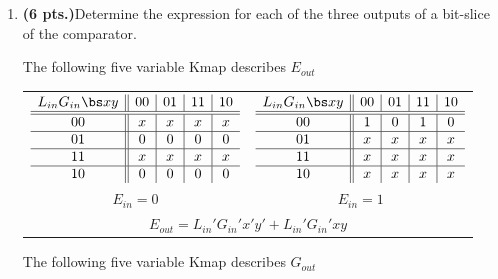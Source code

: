 \begin{enumerate}
\item {\bf (6 pts.)}Determine the \SOPmin expression for each of the 
three outputs of a bit-slice of the comparator.

	\begin{solution}{
	The following five variable Kmap describes $E_{out}$

\begin{tabular}{cc}
$\begin{array} {c||c|c|c|c}
 L_{in} G_{in}  \bs x  y & 00 & 01 & 11 & 10 \\ \hline \hline
       		00       & x  & x  & x  &  x \\ \hline
       		01       & 0  & 0  & 0  &  0 \\ \hline
       		11       & x  & x  & x  &  x \\ \hline
       		10       & 0  & 0  & 0  &  0 \\
\end{array}$ 
&
$\begin{array} {c||c|c|c|c}
 L_{in} G_{in}  \bs x  y & 00 & 01 & 11 & 10 \\ \hline \hline
       		00       & 1  & 0  & 1  & 0  \\ \hline
       		01       & x  & x  & x  & x  \\ \hline
       		11       & x  & x  & x  & x  \\ \hline
       		10       & x  & x  & x  & x  \\
\end{array}$  \\
$E_{in}=0$ & $E_{in}=1$ \\
\multicolumn{2}{c}{$E_{out} = L_{in}'G_{in}'x'y' + L_{in}'G_{in}'xy $} \\
\end{tabular}

The following five variable Kmap describes $G_{out}$

}
\end{solution}
\end{enumerate}
